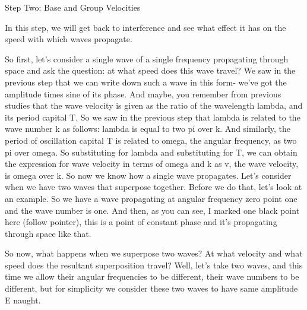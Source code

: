 Step Two: Base and Group Velocities

In this step, we will get back to interference and see what effect it has on the speed with which waves propagate.

So first, let's consider a single wave of a single frequency propagating through space and ask the question: at what speed does this wave travel? We saw in the previous step that we can write down such a wave in this form- we've got the amplitude times sine of its phase. And maybe, you remember from previous studies that the wave velocity is given as the ratio of the wavelength lambda, and its period capital T. So we saw in the previous step that lambda is related to the wave number k as follows: lambda is equal to two pi over k. And similarly, the period of oscillation capital T is related to omega, the angular frequency, as two pi over omega. So substituting for lambda and substituting for T, we can obtain the expression for wave velocity in terms of omega and k as v, the wave velocity, is omega over k. So now we know how a single wave propagates. Let's consider when we have two waves that superpose together. Before we do that, let's look at an example. So we have a wave propagating at angular frequency zero point one and the wave number is one. And then, as you can see, I marked one black point here (follow pointer), this is a point of constant phase and it's propagating through space like that.

So now, what happens when we superpose two waves? At what velocity and what speed does the resultant superposition travel? Well, let's take two waves, and this time we allow their angular frequencies to be different, their wave numbers to be different, but for simplicity we consider these two waves to have same amplitude E naught.

